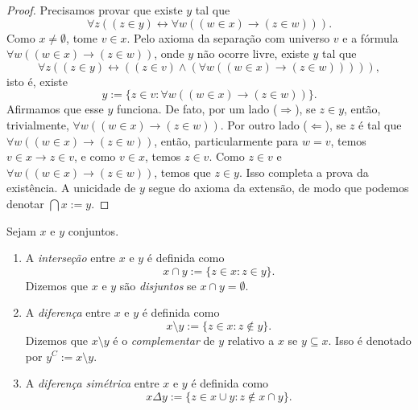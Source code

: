 \begin{proof}
    Precisamos provar que existe $y$ tal que
        \[
           \forall z ( (z \in y) \leftrightarrow \forall w ( (w \in x) \rightarrow (z \in w)) ). 
        \]
    Como $x \neq \emptyset$, tome $v \in x$. Pelo axioma da separação com universo $v$ e a fórmula $\forall w ( (w \in x) \rightarrow (z \in w))$, onde $y$ não ocorre livre, existe $y$ tal que
        \[
            \forall z ( (z \in y) \leftrightarrow ( (z \in v) \land  (\forall w ( (w \in x) \rightarrow (z \in w))) ) ),
        \]
    isto é, existe 
        \[
            y := \{ z \in v : \forall w ( (w \in x) \rightarrow (z \in w)) \}.
        \]
    Afirmamos que esse $y$ funciona. De fato, por um lado ($\Rightarrow$), se $z \in y$, então, trivialmente, $\forall w ((w \in x) \rightarrow (z \in w))$. Por outro lado ($\Leftarrow$), se $z$ é tal que $\forall w ((w \in x) \rightarrow (z \in w))$, então, particularmente para $w = v$, temos $v \in x \rightarrow z \in v$, e como $v \in x$, temos $z \in v$. Como $z \in v$ e $\forall w ((w \in x) \rightarrow (z \in w))$, temos que $z \in y$. Isso completa a prova da existência. A unicidade de $y$ segue do axioma da extensão, de modo que podemos denotar $\bigcap x := y$. \blackproof
\end{proof}

\begin{definition} \label{defi.set:capminus}
    Sejam $x$ e $y$ conjuntos.
        \begin{enumerate}[leftmargin=*, align=left, label=\textbf{(\alph*)}]
            \item A \emph{interseção} entre $x$ e $y$ é definida como
                \[
                    x \cap y :=  \{ z \in x : z \in y\}.
                \]
            Dizemos que $x$ e $y$ são \emph{disjuntos} se $x \cap y = \emptyset$. 
            \item A \emph{diferença} entre $x$ e $y$ é definida como
                \[
                    x \setminus y := \{z \in x : z \notin y \}.
                \]
            Dizemos que $x \setminus y$ é o \emph{complementar} de $y$ relativo a $x$ se $y \subseteq x$. Isso é denotado por $y^{C} := x \setminus y$.
            \item A \emph{diferença simétrica} entre $x$ e $y$ é definida como
                \[
                    x \Delta y := \{ z \in x \cup y :z \notin x \cap y \}.
                \]
        \end{enumerate}
\end{definition}

